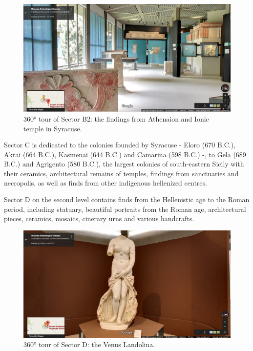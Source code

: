 \documentclass[amsthm,ebook]{saparticle}
\begin{document}
\begin{figure}[!bp]
\centering
 \includegraphics[width=\columnwidth]{EAGLE2016BONACINIPilotprojectatPaoloOrsiMuseum-img003.jpg}
\caption{360° tour of Sector B2: the findings from Athenaion and Ionic temple in Syracuse.}
\label{fig:3}
\end{figure}

Sector C is dedicated to the colonies founded by Syracuse - Eloro (670 B.C.), Akrai (664 B.C.), Kasmenai (644 B.C.) and
Camarina (598 B.C.) -, to Gela (689 B.C.) and Agrigento (580 B.C.), the largest colonies of south-eastern Sicily with
their ceramics, architectural remains of temples, findings from sanctuaries and necropolis, as well as finds from other
indigenous hellenized centres. 

Sector D on the second level contains finds from the Hellenistic age to the Roman period, including statuary, beautiful
portraits from the Roman age, architectural pieces, ceramics, mosaics, cinerary urns and various handcrafts. 

\begin{figure}[!bp]
\centering
 \includegraphics[width=\columnwidth]{EAGLE2016BONACINIPilotprojectatPaoloOrsiMuseum-img004.jpg}
\caption{360° tour of Sector D: the Venus Landolina.}
\label{fig:}
\end{figure}
\end{document}
